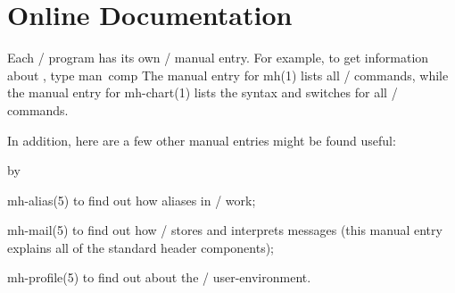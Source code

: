 \section{Online Documentation}
Each \MH/ program has its own \unix/ manual entry.
For example, to get information about ,
type
\example man\ comp\endexample
The manual entry for \man mh(1) lists all \MH/ commands,
while the manual entry for \man mh-chart(1) lists the syntax and switches for
all \MH/ commands.

In addition,
here are a few other manual entries might be found useful:
\smallskip
{\advance\leftskip by\parindent
\item{\man mh-alias(5)} to find out how aliases in \MH/ work;
\item{\man mh-mail(5)} to find out how \MH/ stores and interprets messages
(this manual entry explains all of the standard header components);
\item{\man mh-profile(5)} to find out about the \MH/ user-environment.
\smallskip}

